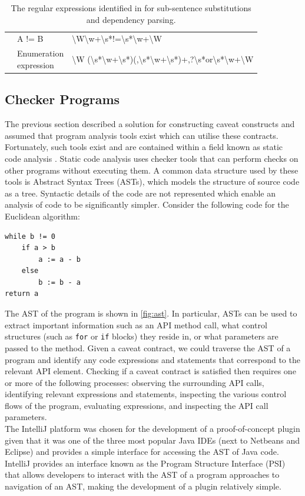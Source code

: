 \begin{table}[h]
\begin{tabular}{|l|l|l|}
		& A != B & \textbackslash{}W\textbackslash{}w+\textbackslash{}s*!=\textbackslash{}s*\textbackslash{}w+\textbackslash{}W \\ \cline{2-3} 
		& \shortstack[l]{Enumeration\\ expression} & \textbackslash{}W (\textbackslash{}s*\textbackslash{}w+\textbackslash{}s*)(,\textbackslash{}s*\textbackslash{}w+\textbackslash{}s*)+,?\textbackslash{}s*or\textbackslash{}s*\textbackslash{}w+\textbackslash{}W \\ \hline
	\end{tabular}
	\caption{The regular expressions identified in \cite{zhou-directive} for sub-sentence substitutions and dependency parsing.}
	\label{tab:zhou-regex}
\end{table}

\subsection{Checker Programs}
\label{sec:code-checker}
The previous section described a solution for constructing caveat constructs and assumed that program analysis tools exist which can utilise these contracts. Fortunately, such tools exist and are contained within a field known as static code analysis \cite{1657940}. Static code analysis uses checker tools that can perform checks on other programs without executing them. A common data structure used by these tools is Abstract Syntax Trees (ASTs), which models the structure of source code as a tree. Syntactic details of the code are not represented which enable an analysis of code to be significantly simpler. Consider the following code for the Euclidean algorithm:

\clearpage

\begin{verbatim}
while b != 0
    if a > b
        a := a - b
    else
        b := b - a
return a
\end{verbatim}

The AST of the program is shown in \ref{fig:ast}. In particular, ASTs can be used to extract important information such as an API method call, what control structures (such as \lstinline{for} or \lstinline{if} blocks) they reside in, or what parameters are passed to the method. Given a caveat contract, we could traverse the AST of a program and identify any code expressions and statements that correspond to the relevant API element. Checking if a caveat contract is satisfied then requires one or more of the following processes: observing the surrounding API calls, identifying relevant expressions and statements, inspecting the various control flows of the program, evaluating expressions, and inspecting the API call parameters. \\
The IntelliJ platform was chosen for the development of a proof-of-concept plugin given that it was one of the three most popular Java IDEs (next to Netbeans and Eclipse) and provides a simple interface for accessing the AST of Java code. IntelliJ provides an interface known as the Program Structure Interface (PSI) that allows developers to interact with the AST of a program approaches to navigation of an AST, making the development of a plugin relatively simple.

